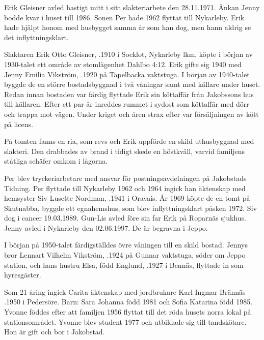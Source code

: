 Erik Gleisner avled hastigt mitt i sitt slakteriarbete den 28.11.1971. Änkan Jenny bodde kvar i huset till 1986. Sonen Per hade 1962 flyttat till Nykarleby. Erik hade hjälpt honom med husbygget samma år som han dog, men hann aldrig se det inflyttningsklart.


Slaktaren Erik Otto Gleisner, .1910 i Socklot, Nykarleby lkm, köpte i början av 1930-talet ett område av stomlägenhet Dahlbo 4:12. Erik gifte sig 1940 med Jenny Emilia Vikström, .1920	på Tapelbacka vaktstuga. I början av 1940-talet byggde de en större bostadsbyggnad i två våningar samt med källare under huset. Redan innan bostaden var färdig flyttade Erik sin köttaffär från Jakobssons hus till källaren. Efter ett par år inreddes rummet i sydost som köttaffär med dörr och trappa mot vägen. Under kriget och åren strax efter var försäljningen av kött på licens.

På tomten fanns en ria, som revs och Erik uppförde en skild uthusbyggnad med slakteri. Den drabbades av brand i tidigt skede en höstkväll, varvid familjens ståtliga schäfer omkom i lågorna.
\begin{jhchildren}
  \item {}
  \item {}
\end{jhchildren}
Per blev tryckeriarbetare med ansvar för postningsavdelningen på 	Jakobstads Tidning. Per flyttade till Nykarleby 1962 och 1964 ingick	han äktenskap med hemsyster Siv Lusette Nordman, .1941	i Oravais. År 1969 köpte de en tomt på Skutnabba, byggde ett egnahemshus, som blev inflyttningsklart påsken 1972. Siv dog i cancer 19.03.1989. Gun-Lis avled före sin far Erik på Roparnäs sjukhus. Jenny avled i Nykarleby den 02.06.1997. De är begravna i Jeppo.


I början på 1950-talet färdigställdes övre våningen till en skild bostad.	Jennys bror Lennart Vilhelm Vikström, .1924 på Gunnar vaktstuga, söder om Jeppo station, och hans hustru Elsa, född Englund, .1927 i Bennäs, flyttade in som hyresgäster.
\begin{jhchildren}
  \item {}
  \item {}
\end{jhchildren}
Som 21-åring ingick Carita äktenskap med	jordbrukare Karl Ingmar Brännäs .1950 i Pedersöre. Barn: Sara Johanna född 1981 och Sofia Katarina född 1985. Yvonne föddes efter att familjen 1956 flyttat till det röda husets norra lokal på stationsområdet. Yvonne blev student 1977 och utbildade sig till tandskötare. Hon är gift och bor i	Jakobstad.

